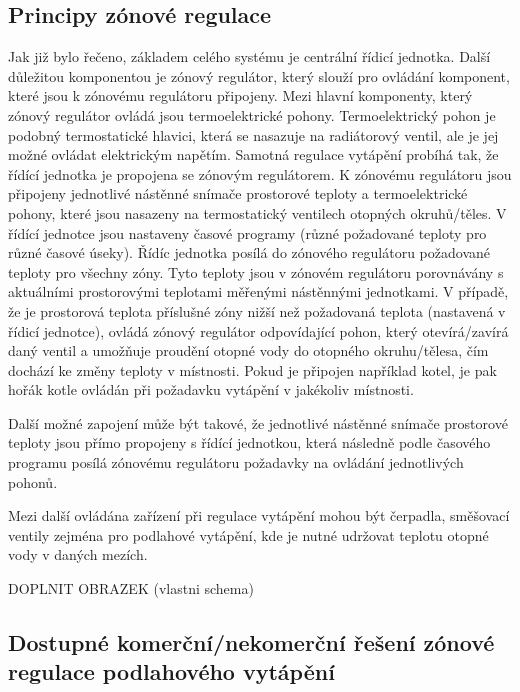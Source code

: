 \subsection{Principy zónové regulace}
Jak již bylo řečeno, základem celého systému je centrální řídicí jednotka. Další důležitou komponentou je zónový regulátor, který slouží pro ovládání komponent, které jsou k zónovému regulátoru připojeny. Mezi hlavní komponenty, který zónový regulátor ovládá jsou termoelektrické pohony. Termoelektrický pohon je podobný termostatické hlavici, která se nasazuje na radiátorový ventil, ale je jej možné ovládat elektrickým napětím. Samotná regulace vytápění probíhá tak, že řídící jednotka je propojena se zónovým regulátorem. K zónovému regulátoru jsou připojeny jednotlivé nástěnné snímače  prostorové teploty a termoelektrické pohony, které jsou nasazeny na termostatický ventilech otopných okruhů/těles. V řídící jednotce jsou nastaveny časové programy (různé požadované teploty pro různé časové úseky). Řídíc jednotka posílá do zónového regulátoru požadované teploty pro všechny zóny. Tyto  teploty jsou v zónovém regulátoru porovnávány s aktuálními prostorovými teplotami měřenými nástěnnými jednotkami. V případě, že je prostorová teplota příslušné zóny nižší než požadovaná teplota (nastavená v řídicí jednotce), ovládá zónový regulátor odpovídající pohon, který otevírá/zavírá daný ventil a umožňuje proudění otopné vody do otopného okruhu/tělesa, čím dochází ke změny teploty v místnosti. Pokud je připojen například kotel, je pak hořák kotle ovládán při požadavku vytápění v jakékoliv místnosti. 

Další možné zapojení může být takové, že jednotlivé nástěnné snímače prostorové teploty jsou přímo propojeny s řídící jednotkou, která následně podle časového programu posílá zónovému regulátoru požadavky na ovládání jednotlivých pohonů. 

Mezi další ovládána zařízení při regulace vytápění mohou být čerpadla, směšovací ventily zejména pro podlahové vytápění, kde je nutné udržovat teplotu otopné vody v daných mezích.

DOPLNIT OBRAZEK (vlastni schema)



\subsection{Dostupné komerční/nekomerční řešení zónové regulace podlahového vytápění}








